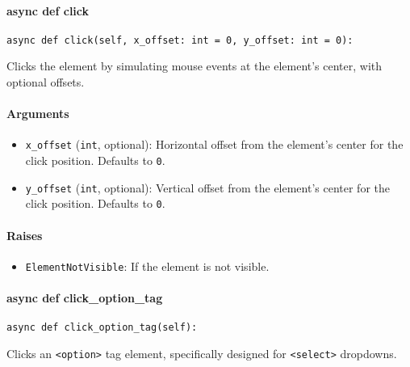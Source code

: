 \documentclass{article}
\begin{document}
\paragraph{async def click}

\begin{lstlisting}[style=pythonstyle]
async def click(self, x_offset: int = 0, y_offset: int = 0):
\end{lstlisting}

\noindent Clicks the element by simulating mouse events at the element's center, with optional offsets.

\paragraph{Arguments}

\begin{itemize}
    \item \lstinline[style=pythonstyle]|x_offset| (\lstinline[style=pythonstyle]|int|, optional): Horizontal offset from the element's center for the click position. Defaults to \lstinline[style=pythonstyle]|0|.
    \item \lstinline[style=pythonstyle]|y_offset| (\lstinline[style=pythonstyle]|int|, optional): Vertical offset from the element's center for the click position. Defaults to \lstinline[style=pythonstyle]|0|.
\end{itemize}

\paragraph{Raises}

\begin{itemize}
    \item \lstinline[style=pythonstyle]|ElementNotVisible|: If the element is not visible.
\end{itemize}

\paragraph{async def click\_option\_tag}

\begin{lstlisting}[style=pythonstyle]
async def click_option_tag(self):
\end{lstlisting}

\noindent Clicks an \lstinline[style=pythonstyle]|<option>| tag element, specifically designed for \lstinline[style=pythonstyle]|<select>| dropdowns.
\end{document}
